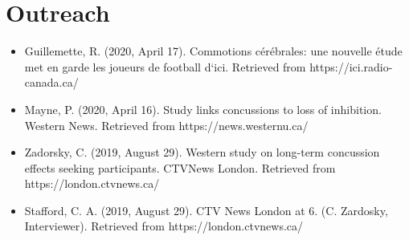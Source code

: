 \documentclass[letterpaper]{twentysecondcv} %
\begin{document}
\begin{twenty} %
\end{twenty}


\section{Outreach}

\begin{itemize}
	\item Guillemette, R. (2020, April 17). Commotions c\'er\'ebrales: une nouvelle \'etude met en garde les joueurs de football d`ici. \newline
	Retrieved from https://ici.radio-canada.ca/
	\item Mayne, P. (2020, April 16). Study links concussions to loss of inhibition. Western News. Retrieved from https://news.westernu.ca/
	\item Zadorsky, C. (2019, August 29). Western study on long-term concussion effects seeking participants. CTVNews London. \newline
	Retrieved from https://london.ctvnews.ca/
	\item Stafford, C. A. (2019, August 29). CTV News London at 6. (C. Zardosky, Interviewer). Retrieved from https://london.ctvnews.ca/
\end{itemize}


\end{document}
